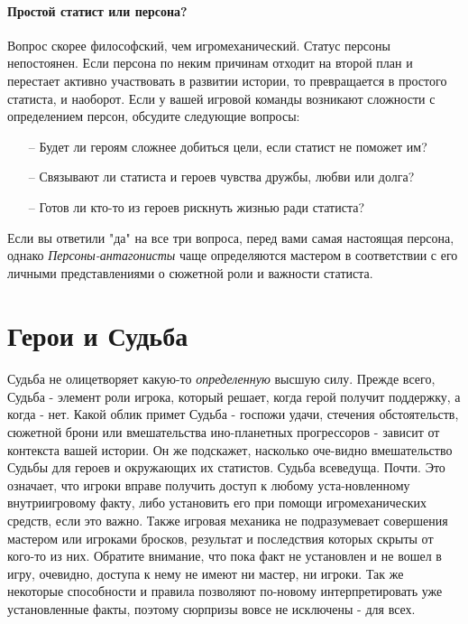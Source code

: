 \paragraph{Простой статист или персона?} Вопрос скорее философский, чем игромеханический. Статус персоны непостоянен. Если персона по неким причинам отходит на второй план и перестает активно участвовать в развитии истории, то превращается в простого статиста, и наоборот. Если у вашей игровой команды возникают сложности с определением персон, обсудите следующие вопросы:
\begin{itemize}
\item[--] Будет ли героям сложнее добиться цели, если статист не поможет им?
\item[--] Связывают ли статиста и героев чувства дружбы, любви или долга?
\item[--] Готов ли кто-то из героев рискнуть жизнью ради статиста?
\end{itemize}
Если вы ответили "да" на все три вопроса, перед вами самая настоящая персона, однако \textit{Персоны-антагонисты} чаще определяются мастером в соответствии с его личными представлениями о сюжетной роли и важности статиста.

\section{Герои и Судьба}
\paragraph{}Судьба не олицетворяет какую-то \textit{определенную} высшую силу. Прежде всего, Судьба - элемент роли игрока, который решает, когда герой получит поддержку, а когда - нет. Какой облик примет Судьба - госпожи удачи, стечения обстоятельств, сюжетной брони или вмешательства ино-планетных прогрессоров - зависит от контекста вашей истории. Он же подскажет, насколько оче-видно вмешательство Судьбы для героев и окружающих их статистов.
\newline Судьба всеведуща. Почти. Это означает, что игроки вправе получить доступ к любому уста-новленному внутриигровому факту, либо установить его при помощи игромеханических средств, если это важно. Также игровая механика не подразумевает совершения мастером или игроками бросков, результат и последствия которых скрыты от кого-то из них.
\newline Обратите внимание, что пока факт не установлен и не вошел в игру, очевидно, доступа к нему не имеют ни мастер, ни игроки. Так же некоторые способности и правила позволяют по-новому интерпретировать уже установленные факты, поэтому сюрпризы вовсе не исключены - для всех.
